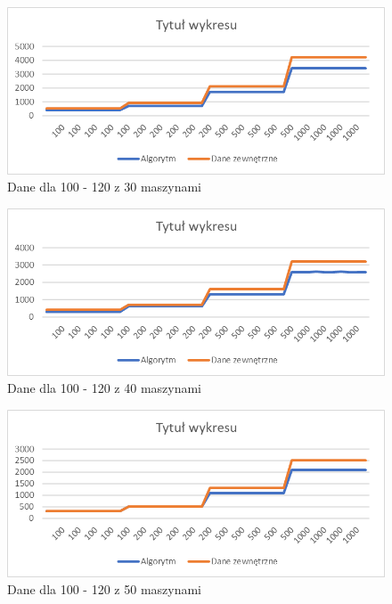 \begin{figure}[h]
    \centering
    \includegraphics[scale=0.3]{100-120_30.png}
    \caption{Dane dla 100 - 120 z 30 maszynami}
    \label{100-120_30}
\end{figure}

\begin{figure}[h]
    \centering
    \includegraphics[scale=0.3]{100-120_40.png}
    \caption{Dane dla 100 - 120 z 40 maszynami}
    \label{100-120_40}
\end{figure}

\begin{figure}[h]
    \centering
    \includegraphics[scale=0.3]{100-120_50.png}
    \caption{Dane dla 100 - 120 z 50 maszynami}
    \label{100-120_50}
\end{figure}


